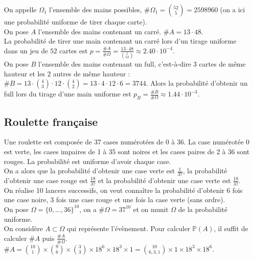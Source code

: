 \documentclass[a4paper,10pt]{book} %
\renewcommand{\P}{\mathbb{P}} %
\begin{document}
On appelle $\Omega_1$ l'ensemble des mains possibles, $\#\Omega_1=\binom{52}{5}=2598960$ (on a ici une probabilité uniforme de tirer chaque carte).\\

On pose $A$ l'ensemble des mains contenant un carré. $\#A=13\cdot 48$.\\

La probabilité de tirer une main contenant un carré lors d'un tirage uniforme dans un jeu de $52$ cartes est $p=\frac{\# A}{\#\Omega}=\frac{13\cdot 48}{\binom{5}{52}}\approx 2.40\cdot 10^{-4}$.\\

On pose $B$ l'ensemble des mains contenant un full, c'est-à-dire 3 cartes de même hauteur et les 2 autres de même hauteur : $\# B=13\cdot \binom{4}{3}\cdot 12\cdot \binom{4}{2}=13\cdot 4\cdot 12\cdot 6=3744$. Alors la probabilité d'obtenir un full lors du tirage d'une main uniforme est $p_B=\frac{\# B}{\#\Omega}\approx 1.44\cdot 10^{-3}$.

\subsection{Roulette française}
Une roulette est composée de 37 cases numérotées de 0 à 36. La case numérotée 0 est verte, les cases impaires de 1 à 35 sont noires et les cases paires de 2 à 36 sont rouges. La probabilité est uniforme d'avoir chaque case.\\

On a alors que la probabilité d'obtenir une case verte est $\frac{1}{37}$, la probabilité d'obtenir une case rouge est $\frac{18}{37}$ et la probabilité d'obtenir une case verte est $\frac{18}{37}$.\\

On réalise 10 lancers successifs, on veut connaître la probabilité d'obtenir 6 fois une case noire, 3 fois une case rouge et une fois la case verte (sans ordre).\\

On pose $\Omega=\{0,...,36\}^{10}$, on a $\#\Omega=37^{10}$ et on munit $\Omega$ de la probabilité uniforme.\\

On considère $A\subset \Omega$ qui représente l'évènement. Pour calculer $\P(A)$, il suffit de calculer $\# A$ puis $\frac{\# A}{\#\Omega}$.
$\# A=\binom{10}{1}\times \binom{9}{6}\times \binom{3}{3}\times 18^6\times 18^3\times 1=\binom{10}{6,3,1}\times 1\times 18^3\times 18^6$.
\end{document}

